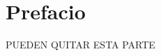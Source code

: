 \documentclass[11pt]{book}
\begin{document}



\chapter*{Prefacio}

\pagestyle{plain}

PUEDEN QUITAR ESTA PARTE



\tableofcontents
\newpage


\mainmatter %
\pagestyle{headings}



\thispagestyle{empty}


\thispagestyle{empty}


\thispagestyle{empty}
\end{document}
